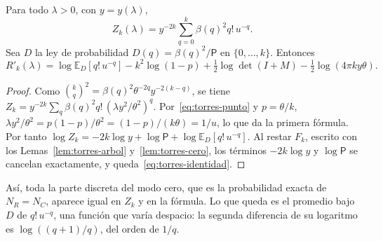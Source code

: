 \begin{lema}\label{lem:torres-identidad}
Para todo $\lambda>0$, con $y=y(\lambda)$,
\[
 Z_k(\lambda)=y^{-2k}\sum_{q=0}^k\beta(q)^2q!\,u^{-q}.
\]
Sea $D$ la ley de probabilidad $D(q)=\beta(q)^2/\mathsf P$ en $\{0,\dots,k\}$. Entonces
\begin{equation}\label{eq:torres-identidad}
 R'_k(\lambda)=\log\mathbb E_D[q!\,u^{-q}]-k^2\log(1-p)+\tfrac12\log\det(I+M)-\tfrac12\log(4\pi ky\theta).
\end{equation}
\end{lema}
\begin{proof}
Como $\binom kq^2=\beta(q)^2\theta^{-2q}y^{-2(k-q)}$, se tiene
$Z_k=y^{-2k}\sum_q\beta(q)^2q!\,(\lambda y^2/\theta^2)^q$. Por~\eqref{eq:torres-punto} y $p=\theta/k$,
$\lambda y^2/\theta^2=p(1-p)/\theta^2=(1-p)/(k\theta)=1/u$, lo que da la primera fórmula. Por tanto
$\log Z_k=-2k\log y+\log\mathsf P+\log\mathbb E_D[q!\,u^{-q}]$. Al restar $F_k$, escrito con los
Lemas~\ref{lem:torres-arbol} y~\ref{lem:torres-cero}, los términos $-2k\log y$ y $\log\mathsf P$ se
cancelan exactamente, y queda~\eqref{eq:torres-identidad}.
\end{proof}

Así, toda la parte discreta del modo cero, que es la probabilidad exacta de $N_R=N_C$, aparece igual en
$Z_k$ y en la fórmula. Lo que queda es el promedio bajo $D$ de $q!\,u^{-q}$, una función que varía
despacio: la segunda diferencia de su logaritmo es $\log((q+1)/q)$, del orden de $1/q$.
